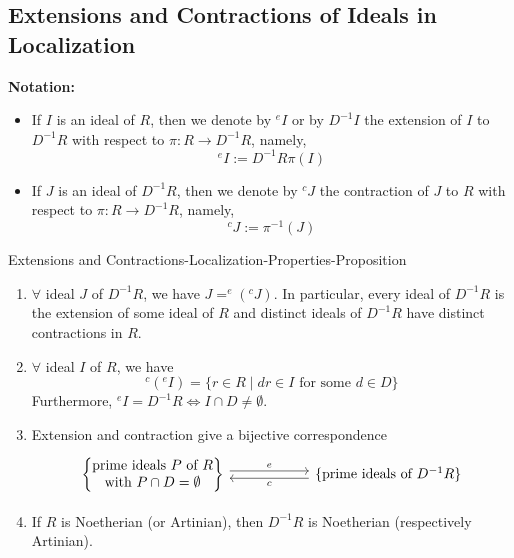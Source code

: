 \subsection{Extensions and Contractions of Ideals in Localization}

\textbf{Notation:} \begin{itemize}
    \item If $I$ is an ideal of $R$, then we denote by $^{e}I$ or by $D^{-1}I$ the extension of $I$ to $D^{-1}R$ with respect to $\pi: R\to D^{-1}R$, namely, 
    $$^e I:= D^{-1}R\pi(I)$$

    \item If $J$ is an ideal of $D^{-1}R$, then we denote by $^cJ$ the contraction of $J$ to $R$ with respect to $\pi:R \to D^{-1}R$, namely,
    $$^cJ:= \pi^{-1} (J)$$
\end{itemize}

\begin{proposition}{Extensions and Contractions-Localization-Properties-Proposition}
\begin{enumerate}
    \item $\forall$ ideal $J$ of $D^{-1}R$, we have $J=^e(^cJ)$. In particular, every ideal of $D^{-1}R$ is the extension of some ideal of $R$ and distinct ideals of $D^{-1}R$ have distinct contractions in $R$.

    \item $\forall$ ideal $I$ of $R$, we have
    $$ ^c(^eI)= \{r\in R\mid dr\in I \text{ for some } d\in D\}$$
    Furthermore, $^eI=D^{-1}R \Leftrightarrow I \cap D\neq \emptyset$.

    \item Extension and contraction give a bijective correspondence
    \[
    \begin{tikzcd}[column sep=2cm]
    \left\{
    \begin{matrix}
        \text{prime ideals } P \text{ of }R\\
        \text{with } P\cap D=\emptyset
    \end{matrix}
    \right \}\arrow[r, shift left=0.6ex, "e"] & \{\text{prime ideals of } D^{-1}R\} \arrow[l, shift left=0.6ex, "c"]
    \end{tikzcd}
    \]

    \item If $R$ is Noetherian (or Artinian), then $D^{-1}R$ is Noetherian (respectively Artinian).
\end{enumerate}
\end{proposition}

